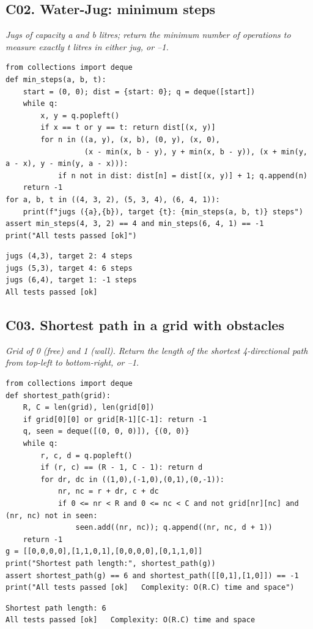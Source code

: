 \documentclass[11pt]{article}
\begin{document}
\subsection*{C02. Water-Jug: minimum steps \hfill{}}
\textit{Jugs of capacity a and b litres; return the minimum number of operations to measure exactly t litres in either jug, or --1.}
\begin{lstlisting}[style=py]
from collections import deque
def min_steps(a, b, t):
    start = (0, 0); dist = {start: 0}; q = deque([start])
    while q:
        x, y = q.popleft()
        if x == t or y == t: return dist[(x, y)]
        for n in ((a, y), (x, b), (0, y), (x, 0),
                  (x - min(x, b - y), y + min(x, b - y)), (x + min(y, a - x), y - min(y, a - x))):
            if n not in dist: dist[n] = dist[(x, y)] + 1; q.append(n)
    return -1
for a, b, t in ((4, 3, 2), (5, 3, 4), (6, 4, 1)):
    print(f"jugs ({a},{b}), target {t}: {min_steps(a, b, t)} steps")
assert min_steps(4, 3, 2) == 4 and min_steps(6, 4, 1) == -1
print("All tests passed [ok]")
\end{lstlisting}
\begin{lstlisting}[style=out]
jugs (4,3), target 2: 4 steps
jugs (5,3), target 4: 6 steps
jugs (6,4), target 1: -1 steps
All tests passed [ok]
\end{lstlisting}
\subsection*{C03. Shortest path in a grid with obstacles \hfill{}}
\textit{Grid of 0 (free) and 1 (wall). Return the length of the shortest 4-directional path from top-left to bottom-right, or --1.}
\begin{lstlisting}[style=py]
from collections import deque
def shortest_path(grid):
    R, C = len(grid), len(grid[0])
    if grid[0][0] or grid[R-1][C-1]: return -1
    q, seen = deque([(0, 0, 0)]), {(0, 0)}
    while q:
        r, c, d = q.popleft()
        if (r, c) == (R - 1, C - 1): return d
        for dr, dc in ((1,0),(-1,0),(0,1),(0,-1)):
            nr, nc = r + dr, c + dc
            if 0 <= nr < R and 0 <= nc < C and not grid[nr][nc] and (nr, nc) not in seen:
                seen.add((nr, nc)); q.append((nr, nc, d + 1))
    return -1
g = [[0,0,0,0],[1,1,0,1],[0,0,0,0],[0,1,1,0]]
print("Shortest path length:", shortest_path(g))
assert shortest_path(g) == 6 and shortest_path([[0,1],[1,0]]) == -1
print("All tests passed [ok]   Complexity: O(R.C) time and space")
\end{lstlisting}
\begin{lstlisting}[style=out]
Shortest path length: 6
All tests passed [ok]   Complexity: O(R.C) time and space
\end{lstlisting}
\end{document}
